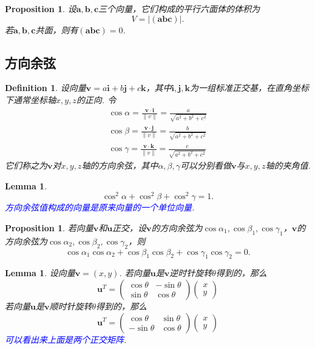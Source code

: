 \documentclass{article}
\newcommand{\mbf}[1]{\bm{#1}}
\newtheorem{lemma}[theorem]{Lemma}
\newtheorem{proposition}[theorem]{Proposition}
\newtheorem{definition}[theorem]{Definition}
\newcommand{\norm}[1]{\left\lVert#1\right\rVert} %
\newcommand{\bluet}[1]{\textcolor{blue}{#1}}
\begin{document}
\begin{proposition}
\rm 设$\mbf{a},\mbf{b},\mbf{c}$三个向量，它们构成的平行六面体的体积为
$$
V = |(\mbf{a}\mbf{b}\mbf{c})|.
$$
若$\mbf{a},\mbf{b},\mbf{c}$共面，则有$(\mbf{a}\mbf{b}\mbf{c})=0$.  
\end{proposition}

\subsection{方向余弦}

\begin{definition}
\rm 设向量$\mbf{v} = a\mbf{i} + b\mbf{j} + c\mbf{k}$，其中$\mbf{i},\mbf{j},\mbf{k}$为一组标准正交基，在直角坐标下通常坐标轴$x,y,z$的正向. 令
$$
\begin{aligned}
\cos \alpha = \frac{\mbf{v}\cdot\mbf{i}}{\norm{v}} = \frac{a}{\sqrt{a^2 + b^2 + c^2}}\\
\cos \beta =  \frac{\mbf{v}\cdot\mbf{j}}{\norm{v}} = \frac{b}{\sqrt{a^2 + b^2 + c^2}} \\
\cos \gamma =  \frac{\mbf{v}\cdot\mbf{k}}{\norm{v}} = \frac{c}{\sqrt{a^2 + b^2 + c^2}}
\end{aligned}
$$
它们称之为$\mbf{v}$对$x,y,z$轴的方向余弦，其中$\alpha,\beta,\gamma$可以分别看做$\mbf{v}$与$x,y,z$轴的夹角值. 
\end{definition}

\begin{lemma}
\rm 
$$
\cos^2\alpha + \cos^2\beta + \cos^2\gamma = 1.
$$
\bluet{方向余弦值构成的向量是原来向量的一个单位向量}. 
\end{lemma}

\begin{proposition}
\rm 若向量$\mbf{v}$和$\mbf{u}$正交，设$\mbf{v}$的方向余弦为$\cos \alpha_1, \cos \beta_1, \cos \gamma_1$，$\mbf{v}$的方向余弦为$\cos \alpha_2, \cos \beta_2, \cos \gamma_2$，则
$$
\cos \alpha_1\cos \alpha_2 + \cos \beta_1\cos \beta_2 + \cos \gamma_1\cos \gamma_2 = 0.
$$

\end{proposition}

\begin{lemma}
\rm 设向量$\mbf{v}=(x,y)$. 若向量$\mbf{u}$是$\mbf{v}$逆时针旋转$\theta$得到的，那么
$$
\mbf{u}^T = \begin{pmatrix}
\cos\theta & -\sin\theta \\
\sin\theta & \cos\theta
\end{pmatrix} \begin{pmatrix}
x \\
y
\end{pmatrix}
$$
若向量$\mbf{u}$是$\mbf{v}$顺时针旋转$\theta$得到的，那么
$$
\mbf{u}^T = \begin{pmatrix}
\cos\theta & \sin\theta \\
-\sin\theta & \cos\theta
\end{pmatrix} \begin{pmatrix}
x \\
y
\end{pmatrix}
$$
\bluet{可以看出来上面是两个正交矩阵}.
\end{lemma}
\end{document}
